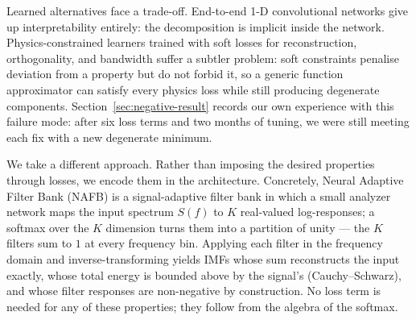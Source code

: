 \documentclass[journal]{IEEEtran}
\theoremstyle{remark}
\begin{document}
Learned alternatives face a trade-off. End-to-end 1-D convolutional
networks give up interpretability entirely: the decomposition is
implicit inside the network. Physics-constrained learners trained with
soft losses for reconstruction, orthogonality, and bandwidth suffer a
subtler problem: soft constraints penalise deviation from a property
but do not forbid it, so a generic function approximator can satisfy
every physics loss while still producing degenerate components.
Section~\ref{sec:negative-result} records our own experience with this
failure mode: after six loss terms and two months of tuning, we were
still meeting each fix with a new degenerate minimum.

We take a different approach. Rather than imposing the desired
properties through losses, we encode them in the architecture.
Concretely, Neural Adaptive Filter Bank (NAFB) is a
signal-adaptive filter bank in which a small analyzer network maps the
input spectrum $S(f)$ to $K$ real-valued log-responses; a softmax over
the $K$ dimension turns them into a partition of unity --- the $K$
filters sum to $1$ at every frequency bin. Applying each filter in the
frequency domain and inverse-transforming yields IMFs whose sum
reconstructs the input exactly, whose total energy is bounded above by
the signal's (Cauchy--Schwarz), and whose filter responses are
non-negative by construction. No loss term is needed for any of these
properties; they follow from the algebra of the softmax.
\end{document}

